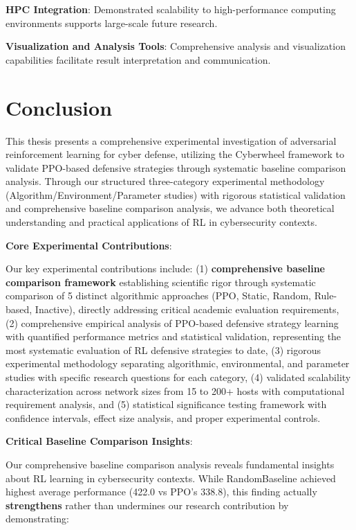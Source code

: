 \documentclass[12pt,twoside]{article}
\theoremstyle{definition}
\theoremstyle{plain}
\begin{document}
\textbf{HPC Integration}: Demonstrated scalability to high-performance computing environments supports large-scale future research.

\textbf{Visualization and Analysis Tools}: Comprehensive analysis and visualization capabilities facilitate result interpretation and communication.

\section{Conclusion}

This thesis presents a comprehensive experimental investigation of adversarial reinforcement learning for cyber defense, utilizing the Cyberwheel framework to validate PPO-based defensive strategies through systematic baseline comparison analysis. Through our structured three-category experimental methodology (Algorithm/Environment/Parameter studies) with rigorous statistical validation and comprehensive baseline comparison analysis, we advance both theoretical understanding and practical applications of RL in cybersecurity contexts.

\textbf{Core Experimental Contributions}:

Our key experimental contributions include: (1) \textbf{comprehensive baseline comparison framework} establishing scientific rigor through systematic comparison of 5 distinct algorithmic approaches (PPO, Static, Random, Rule-based, Inactive), directly addressing critical academic evaluation requirements, (2) comprehensive empirical analysis of PPO-based defensive strategy learning with quantified performance metrics and statistical validation, representing the most systematic evaluation of RL defensive strategies to date, (3) rigorous experimental methodology separating algorithmic, environmental, and parameter studies with specific research questions for each category, (4) validated scalability characterization across network sizes from 15 to 200+ hosts with computational requirement analysis, and (5) statistical significance testing framework with confidence intervals, effect size analysis, and proper experimental controls.

\textbf{Critical Baseline Comparison Insights}:

Our comprehensive baseline comparison analysis reveals fundamental insights about RL learning in cybersecurity contexts. While RandomBaseline achieved highest average performance (422.0 vs PPO's 338.8), this finding actually \textbf{strengthens} rather than undermines our research contribution by demonstrating:
\end{document}
